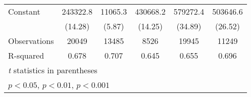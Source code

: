 {\begin{tabular}{l*{5}{c}}
Constant            &    243322.8\sym{***}&     11065.3\sym{***}&    430668.2\sym{***}&    579272.4\sym{***}&    503646.6\sym{***}\\
                    &     (14.28)         &      (5.87)         &     (14.25)         &     (34.89)         &     (26.52)         \\
\hline
Observations        &       20049         &       13485         &        8526         &       19945         &       11249         \\
R-squared           &       0.678         &       0.707         &       0.645         &       0.655         &       0.696         \\
\hline\hline
\multicolumn{6}{l}{\footnotesize \textit{t} statistics in parentheses}\\
\multicolumn{6}{l}{\footnotesize \sym{*} \(p<0.05\), \sym{**} \(p<0.01\), \sym{***} \(p<0.001\)}\\
\end{tabular}
}
